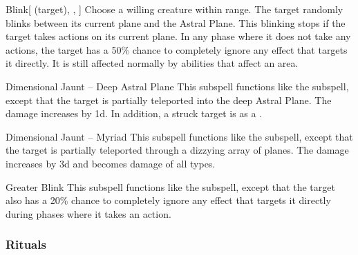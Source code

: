 \begin{ability}[\nth{4}]{Blink}[ (target), , ]
Choose a willing creature within \rngclose range.
The target randomly blinks between its current plane and the Astral Plane.
This blinking stops if the target takes actions on its current plane.
In any phase where it does not take any actions, the target has a 50\% chance to completely ignore any effect that targets it directly.
It is still affected normally by abilities that affect an area.
\end{ability}
\vspace{0.25em}



\begin{ability}[\nth{5}]{Dimensional Jaunt -- Deep Astral Plane}
This subspell functions like the  subspell, except that the target is partially teleported into the deep Astral Plane.
The damage increases by \plus1d.
In addition, a struck target is  as a .
\end{ability}
\vspace{0.25em}



\begin{ability}[\nth{6}]{Dimensional Jaunt -- Myriad}
This subspell functions like the  subspell, except that the target is partially teleported through a dizzying array of planes.
The damage increases by \plus3d and becomes damage of all types.
\end{ability}
\vspace{0.25em}



\begin{ability}[\nth{7}]{Greater Blink}
This subspell functions like the  subspell, except that the target also has a 20\% chance to completely ignore any effect that targets it directly during phases where it takes an action.
\end{ability}
\vspace{0.25em}



\subsubsection{Rituals}


